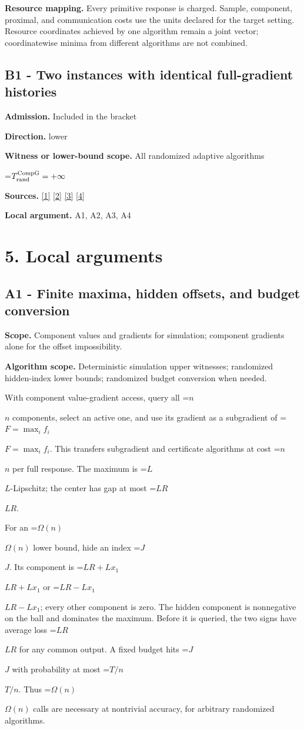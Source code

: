 \documentclass[10pt,a4paper]{article}
\newcommand{\AtlasMath}[1]{\par\begingroup\centering\setbox0=\hbox{$\displaystyle #1$}\ifdim\wd0>1.4\linewidth\typeout{ATLAS WIDE FORMULA: \the\wd0}\fi\ifdim\wd0>\linewidth\resizebox{\linewidth}{!}{\box0}\else\box0\fi\par\endgroup}
\newcommand{\AtlasInlineMath}[1]{\begingroup\setbox0=\hbox{$#1$}\ifdim\wd0>.4\linewidth\endgroup\AtlasMath{#1}\else\endgroup$#1$\fi}
\begin{document}
\textbf{Resource mapping.} Every primitive response is charged. Sample, component, proximal, and communication costs use the units declared for the target setting. Resource coordinates achieved by one algorithm remain a joint vector; coordinatewise minima from different algorithms are not combined.

\subsection{B1 - Two instances with identical full-gradient histories}
\textbf{Admission.} Included in the bracket

\textbf{Direction.} lower

\textbf{Witness or lower-bound scope.} All randomized adaptive algorithms

\AtlasMath{T_{\rm rand}^{\rm CompG}=+\infty}
\textbf{Sources.} \href{https://arxiv.org/pdf/2311.10886}{[1]} \href{https://arxiv.org/pdf/1405.4980}{[2]} \href{https://www2.isye.gatech.edu/~nemirovs/MOR_AccuracyCertificates.pdf}{[3]} \href{https://arxiv.org/pdf/2609.20701}{[4]}

\textbf{Local argument.} A1, A2, A3, A4

\section{5. Local arguments}
\subsection{A1 - Finite maxima, hidden offsets, and budget conversion}
\textbf{Scope.} Component values and gradients for simulation; component gradients alone for the offset impossibility.

\textbf{Algorithm scope.} Deterministic simulation upper witnesses; randomized hidden-index lower bounds; randomized budget conversion when needed.

With component value-gradient access, query all \AtlasInlineMath{n} components, select an active one, and use its gradient as a subgradient of \AtlasInlineMath{F=\max_i f_i}. This transfers subgradient and certificate algorithms at cost \AtlasInlineMath{n} per full response. The maximum is \AtlasInlineMath{L}-Lipschitz; the center has gap at most \AtlasInlineMath{LR}.

For an \AtlasInlineMath{\Omega(n)} lower bound, hide an index \AtlasInlineMath{J}. Its component is \AtlasInlineMath{LR+Lx_1} or \AtlasInlineMath{LR-Lx_1}; every other component is zero. The hidden component is nonnegative on the ball and dominates the maximum. Before it is queried, the two signs have average loss \AtlasInlineMath{LR} for any common output. A fixed budget hits \AtlasInlineMath{J} with probability at most \AtlasInlineMath{T/n}. Thus \AtlasInlineMath{\Omega(n)} calls are necessary at nontrivial accuracy, for arbitrary randomized algorithms.
\end{document}
